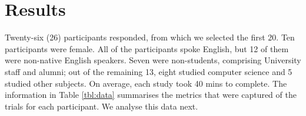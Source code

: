 \documentclass{sigchi}
\begin{document}

\section{Results}

Twenty-six (26) participants responded, from which we selected the first 20.  Ten participants were female.  All of the participants spoke English, but 12 of them were non-native English speakers.  Seven were non-students, comprising University staff and alumni; out of the remaining 13, eight studied computer science and 5 studied other subjects.   On average, each study took 40 mins to complete.  The information in Table \ref{tbl:data} summarises the metrics that were captured of the trials for each participant. We analyse this data next.
\end{document}
